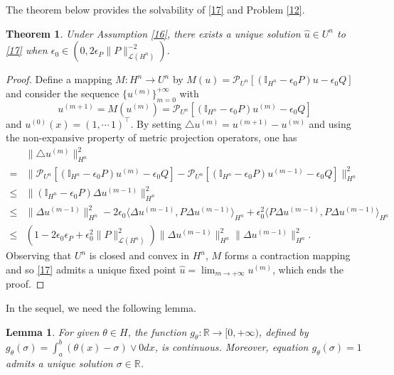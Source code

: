 \documentclass[10pt]{article}
\newtheorem{thm}{Theorem}[section]
\newtheorem{lemma}{Lemma}[section]
\begin{document}
The theorem below provides the solvability of \eqref{17} and  Problem \ref{12}.
\begin{thm}\label{29}
Under Assumption \ref{16}, there exists a unique solution $\widehat{u}\in U^n$ to \eqref{17} when $\epsilon_0\in(0,2\epsilon_P\|P\|_{\mathcal{L}(H^n)}^{-2})$.
\end{thm}
\begin{proof}
Define a mapping $M:H^n\rightarrow U^n$ by $M(u)=\mathcal{P}_{U^n}[(\mathbb{I}_{H^n}-\epsilon_0P){u}-\epsilon_0Q]$ and consider the sequence $\{u^{(m)}\}_{m=0}^{+\infty}$ with
\begin{equation}\label{81}
u^{(m+1)}=M(u^{(m)})=\mathcal{P}_{U^n}[(\mathbb{I}_{H^n}-\epsilon_0P){u^{(m)}}-\epsilon_0Q]
\end{equation}
 and $u^{(0)}(x)=(1,\cdots\,1)^{\top}$. By setting $\triangle u^{(m)}=u^{(m+1)}-u^{(m)}$ and using the non-expansive property of metric projection operators, one has
\begin{align*}
&\|\triangle u^{(m)}\|^2_{H^n}\\
=& \|\mathcal{P}_{U^n}[(\mathbb{I}_{H^n}-\epsilon_0P){u^{(m)}}-\epsilon_0Q]-\mathcal{P}_{U^n}[(\mathbb{I}_{H^n}-\epsilon_0P){u^{(m-1)}}-\epsilon_0Q]\|^2_{H^n}\\
\leq & \|(\mathbb{I}_{H^n}-\epsilon_0P){\Delta u^{(m-1)}}\|^2_{H^n}\\
\leq & \|{\Delta u^{(m-1)}}\|^2_{H^n}-2\epsilon_0\langle \Delta u^{(m-1)}, P\Delta u^{(m-1)}\rangle_{H^n}+\epsilon^2_0\langle P\Delta u^{(m-1)}, P\Delta u^{(m-1)}\rangle_{H^n}\\
\leq&  (1-2\epsilon_0\epsilon_P+\epsilon^2_0\|P\|^2_{\mathcal{L}(H^n)})\|{\Delta u^{(m-1)}}\|^2_{H^n}\|{\Delta u^{(m-1)}}\|^2_{H^n}.
\end{align*}
Observing that $U^n$ is closed and convex in $H^n$,  $M$ forms a contraction mapping and so \eqref{17} admits a unique fixed point $\widehat{u}=\lim_{m\rightarrow+\infty}u^{(m)}$, which ends the proof.
\end{proof}
In the sequel, we need the following lemma.
\begin{lemma}\label{24}
For given $\theta\in H$, the function  $g_{\theta}:\mathbb{R}\rightarrow[0,+\infty)$, defined by $g_{\theta}(\sigma)=\int_a^b(\theta(x)-\sigma)\vee 0dx$, is continuous. Moreover, equation $g_{\theta}(\sigma)=1$ admits a unique solution $\sigma\in\mathbb{R}$.
\end{lemma}
\end{document}
